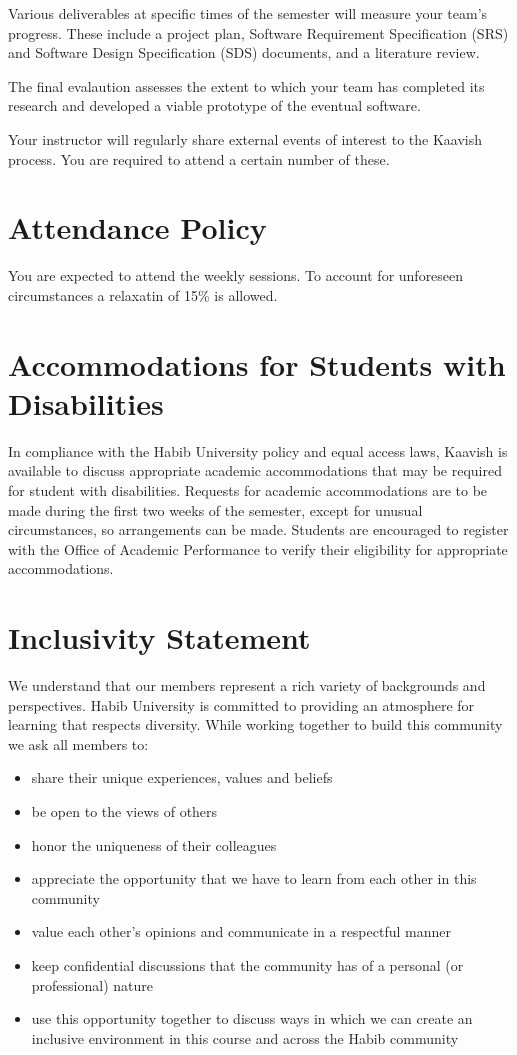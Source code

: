 \documentclass[a4paper]{article}
\newcommand{\new}[1]{{#1}}
\begin{document}
\new{Various deliverables at specific times of the semester will measure your team's progress. These include a project plan, Software Requirement Specification (SRS) and Software Design Specification (SDS) documents, and a literature review.}

\new{The final evalaution assesses the extent to which your team has completed its research and developed a viable prototype of the eventual software.}

\new{Your instructor will regularly share external events of interest to the Kaavish process. You are required to attend a certain number of these.}

\section{Attendance Policy}

\new{You are expected to attend the weekly sessions. To account for unforeseen circumstances a relaxatin of 15\% is allowed.}

\section{Accommodations for Students with Disabilities}
In compliance with the Habib University policy and equal access laws, Kaavish is available to discuss appropriate academic accommodations that may be required for student with disabilities. Requests for academic accommodations are to be made during the first two weeks of the semester, except for unusual circumstances, so arrangements can be made. Students are encouraged to register with the Office of Academic Performance to verify their eligibility for appropriate accommodations.

\section{Inclusivity Statement}
We understand that our members represent a rich variety of backgrounds and perspectives. Habib University is committed to providing an atmosphere for learning that respects diversity. While working together to build this community we ask all members to:
\begin{itemize}
	\item share their unique experiences, values and beliefs
	\item be open to the views of others 
	\item honor the uniqueness of their colleagues
	\item appreciate the opportunity that we have to learn from each other in this community
	\item value each other’s opinions and communicate in a respectful manner
	\item keep confidential discussions that the community has of a personal (or professional) nature 
	\item use this opportunity together to discuss ways in which we can create an inclusive environment in this course and across the Habib community 
\end{itemize}
\end{document}
